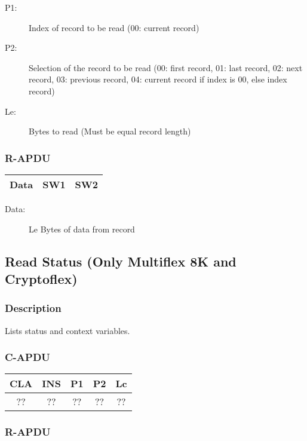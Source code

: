 \documentclass[a4paper,oneside]{article}
\begin{document}
\begin{description}
\item[P1:] Index of record to be read (00: current record)
\item[P2:] Selection of the record to be read (00: first record,
     01: last record, 02: next record, 03: previous record,
     04: current record if index is 00, else index record)
\item[Le:] Bytes to read (Must be equal record length)
\end{description}

\subsubsection*{R-APDU}

\begin{tabular}{|c|c|c|} \hline
Data & SW1 & SW2 \\ \hline
\end{tabular}

\begin{description}
\item[Data:] Le Bytes of data from record
\end{description}


\subsection{Read Status (Only Multiflex 8K and Cryptoflex)}

\subsubsection*{Description}

Lists status and context variables.

\subsubsection*{C-APDU}

\begin{tabular}{|c|c|c|c|c|} \hline
CLA & INS & P1 & P2 & Lc \\ \hline \hline
?? & ?? & ?? & ?? & ?? \\ \hline
\end{tabular}

\subsubsection*{R-APDU}
\end{document}
